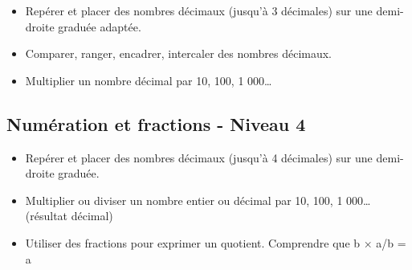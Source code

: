 \documentclass[a4paper,12pt,fleqn]{article}
\begin{document}
\begin{itemize}
	\item {}Repérer et placer des nombres décimaux (jusqu’à 3 décimales) sur une demi-droite graduée adaptée.
	\item {}Comparer, ranger, encadrer, intercaler des nombres décimaux.
	\item {}Multiplier un nombre décimal par 10, 100, 1 000…
\end{itemize}

\subsection*{Numération et fractions - Niveau 4}

\begin{itemize}
	\item {}Repérer et placer des nombres décimaux (jusqu’à 4 décimales) sur une demi-droite graduée.
	\item {}Multiplier ou diviser un nombre entier ou décimal par 10, 100, 1 000… (résultat décimal)
	\item {}Utiliser des fractions pour exprimer un quotient. Comprendre que b × a/b = a
\end{itemize}

	
\end{document}
